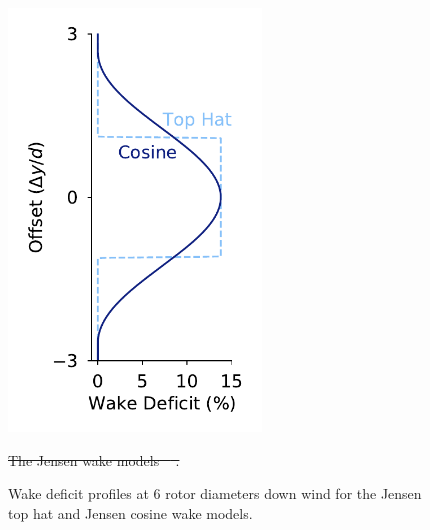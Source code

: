 \documentclass[hidelinks,sort&compress,AMA,STIX1COL]{WileyNJD-v2}
\providecommand{\DIFdel}[1]{{\protect\color{red}\sout{#1}}}                      %
\providecommand{\DIFdelFL}[1]{\DIFdel{#1}} %
\providecommand{\DIFaddbeginFL}{} %
\providecommand{\DIFaddendFL}{} %
\providecommand{\DIFdelbeginFL}{} %
\providecommand{\DIFdelendFL}{} %
\newcommand{\DIFscaledelfig}{0.5}
\newlength{\DIFdelgraphicswidth} %
\newlength{\DIFdelgraphicsheight} %
\newcommand{\DIFaddincludegraphics}[2][]{{\color{blue}\fbox{\DIFOincludegraphics[#1]{#2}}}} %
\newcommand{\DIFdelincludegraphics}[2][]{%
\sbox{\DIFdelgraphicsbox}{\DIFOincludegraphics[#1]{#2}}%
\settoboxwidth{\DIFdelgraphicswidth}{\DIFdelgraphicsbox} %
\settoboxtotalheight{\DIFdelgraphicsheight}{\DIFdelgraphicsbox} %
\scalebox{\DIFscaledelfig}{%
\parbox[b]{\DIFdelgraphicswidth}{\usebox{\DIFdelgraphicsbox}\\[-\baselineskip] \rule{\DIFdelgraphicswidth}{0em}}\llap{\resizebox{\DIFdelgraphicswidth}{\DIFdelgraphicsheight}{%
\setlength{\unitlength}{\DIFdelgraphicswidth}%
\begin{picture}(1,1)%
\thicklines\linethickness{2pt} %
{\color[rgb]{1,0,0}\put(0,0){\framebox(1,1){}}}%
{\color[rgb]{1,0,0}\put(0,0){\line( 1,1){1}}}%
{\color[rgb]{1,0,0}\put(0,1){\line(1,-1){1}}}%
\end{picture}%
}\hspace*{3pt}}} %
} %
\DeclareRobustCommand{\DIFaddbeginFL}{\DIFOaddbeginFL \let\includegraphics\DIFaddincludegraphics} %
\DeclareRobustCommand{\DIFaddendFL}{\DIFOaddendFL \let\includegraphics\DIFOincludegraphics} %
\DeclareRobustCommand{\DIFdelbeginFL}{\DIFOdelbeginFL \let\includegraphics\DIFdelincludegraphics} %
\DeclareRobustCommand{\DIFdelendFL}{\DIFOaddendFL \let\includegraphics\DIFOincludegraphics} %
\begin{document}
\begin{figure}[h!]
{	}\begin{minipage}[t]{0.35\textwidth}
		\DIFaddendFL \centering
		\DIFdelbeginFL %
\DIFdelendFL \DIFaddbeginFL \includegraphics[width=0.6\textwidth, trim={1.05cm 0cm 1.05cm 0cm}]{wake_model_visualizations/Figure_3}
		\DIFaddendFL \caption{Wake deficit profiles at 6 rotor diameters down wind for the Jensen top hat and Jensen cosine wake models.}
		\label{fig:JensenProfiles}
	\DIFdelbeginFL %
{%
\DIFdelFL{The Jensen wake models \mbox{%
\cite{jensen1983}}\hspace{0pt}%
.}}
\DIFdelendFL \DIFaddbeginFL \end{minipage}
\DIFaddendFL \end{figure}
\end{document}
